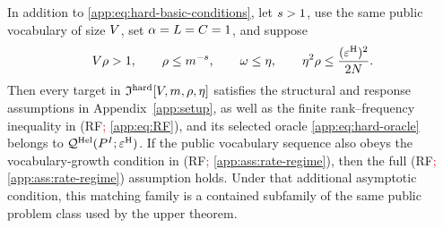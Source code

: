 \begin{proposition}
\label{app:prop:hard-family-inclusion}
In addition to \eqref{app:eq:hard-basic-conditions}, let
$s>1$, use the same public vocabulary of size $V$,
set
$\alpha=L=C=1$, and suppose
\begin{equation}
 V\rho>1,
 \qquad
 \rho\le m^{-s},
 \qquad
 \omega\le\eta,
 \qquad
 \eta^2\rho\le\frac{(\varepsilon^{\mathrm H})^2}{2N}.
 \label{app:eq:finite-hard-inclusion}
\end{equation}
Then every target in
$\mathfrak I^{\mathrm{hard}}[V,m,\rho,\eta]$
satisfies the structural and response assumptions in
Appendix~\ref{app:setup}, as well as the finite rank--frequency inequality in
(RF\textcolor{red}{; \cref{app:eq:RF}}), and its selected oracle \eqref{app:eq:hard-oracle} belongs to
$\mathcal Q^{\mathrm{Hel}}(P^{I};\varepsilon^{\mathrm H})$.  If the public vocabulary
sequence also obeys the vocabulary-growth condition in (RF\textcolor{red}{; \cref{app:ass:rate-regime}}), then the full
(RF\textcolor{red}{; \cref{app:ass:rate-regime}}) assumption holds.  Under that additional asymptotic condition, this
matching family is a contained subfamily of the same public problem class
used by the upper theorem.
\end{proposition}

